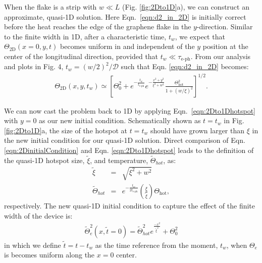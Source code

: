 \documentclass[aip, amsmath,amssymb, reprint]{revtex4-1}
\newcommand{\ba}{\begin{eqnarray}}
\newcommand{\ea}{\end{eqnarray}}
\begin{document}
When the flake is a strip with $w\ll L$ (Fig. \ref{fig:2Dto1D}a), we can construct an approximate, quasi-1D solution. Here Eqn.\ \ref{eqn:d2_in_2D} is initially correct before the heat reaches the edge of the graphene flake in the $y$-direction. Similar to the finite width in 1D, after a characteristic time, $t_w$, we expect that $\Theta_{\text{2D}}(x=0,y,t)$ becomes uniform in and independent of the $y$ position at the center of the longitudinal direction, provided that $t_w \ll \tau_{\text{e-ph}}$. From our analysis and plots in Fig. 4, $t_w = (w/2)^2/\mathcal{D}$ such that Eqn. \ref{eqn:d2_in_2D} becomes:
\ba \Theta_{\text{2D}}(x, y, t_w) \simeq \left[\Theta_0^2 + e^{-\frac{t_w}{t_{\text{e-ph}}}}e^{-\frac{x^2+y^2}{\xi^2+w^2}}\frac{\Theta_{\text{hot}}^2}{1+(w/\xi)^2}\right]^{1/2}.\label{eqn:2Dto1Dhotspot}\ea 

We can now cast the problem back to 1D by applying Eqn.~\ref{eqn:2Dto1Dhotspot} with $y = 0$ as our new initial condition. Schematically shown as $t=t_w$ in Fig. \ref{fig:2Dto1D}a, the size of the hotspot at $t=t_w$ should have grown larger than $\xi$ in the new initial condition for our quasi-1D solution. Direct comparison of Eqn. \ref{eqn:2DinitialCondition} and Eqn. \ref{eqn:2Dto1Dhotspot} leads to the definition of the quasi-1D hotspot size, $\tilde{\xi}$, and temperature, $\tilde{\Theta}_{hot}$, as:
\ba \tilde{\xi} &=& \sqrt{\xi^2+w^2} \\
\tilde{\Theta}_{hot} &=& e^{-\frac{t_w}{2t_{\text{e-ph}}}} \left(\frac{\xi}{\tilde{\xi}}\right) \Theta_{\text{hot}}, \ea respectively. The new quasi-1D initial condition to capture the effect of the finite width of the device is:
\ba \tilde{\Theta}_e^2(x,\tilde{t}=0) = \tilde{\Theta}_{hot}^2 e^{\frac{-x^2}{\tilde{\xi}^2}}+\Theta_0^2 \label{eqn:2Dto1DInitial}\ea in which we define $\tilde{t} = t - t_w$ as the time reference from the moment, $t_w$, when $\Theta_e$ is becomes uniform along the $x=0$ center.
\end{document}
